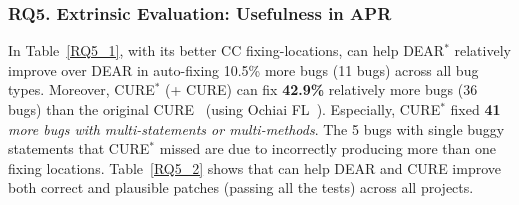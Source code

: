 \subsubsection{\bf RQ5. Extrinsic Evaluation: Usefulness in APR}
In Table~\ref{RQ5_1}, with its better CC fixing-locations, {\tool} can
help DEAR$^{*}$ relatively improve over DEAR in auto-fixing 10.5\%
more bugs (11 bugs) across all bug types. Moreover, CURE$^{*}$
({\tool}+ CURE) can fix {\bf 42.9\%} relatively more bugs (36 bugs)
than the original CURE~\cite{cure-icse21} (using Ochiai
FL~\cite{Ochiai}). Especially, CURE$^{*}$ fixed {\bf 41} {\em more bugs
with multi-statements or multi-methods}. The 5 bugs with
single buggy statements that CURE$^{*}$ missed are due to {\tool}
incorrectly producing more than one fixing locations.
Table~\ref{RQ5_2} shows that{\tool} can help DEAR and CURE improve
both correct and plausible patches (passing all the tests) across all
projects.



